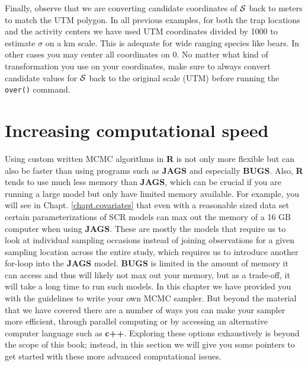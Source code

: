 Finally, observe that we are converting candidate coordinates of ${\cal S}$
back to meters to match the UTM polygon. In all previous examples,
for both the trap locations and the activity centers we have used UTM
coordinates divided by 1000 to estimate $\sigma$ on a km scale. This is
adequate for wide ranging species like bears. In other cases you
may center all coordinates on 0. No matter what kind of transformation you
use on your coordinates, make sure to always convert candidate values for
${\cal S}$ back to the original scale (UTM) before running the
\verb#over()# command.

\section{Increasing computational speed}
Using custom written MCMC algorithms in {\bf R} is not only more flexible but can also be faster than using programs such as {\bf JAGS} and especially {\bf BUGS}. Also, {\bf R} tends to use much less memory than {\bf JAGS}, which can be crucial if you are running a large model but only have limited memory available. For example, you will see in Chapt. \ref{chapt.covariates} that even with a reasonable sized data set certain parameterizations of SCR models can max out the memory of a 16 GB computer when using {\bf JAGS}. These are mostly the models that require us to look at individual sampling occasions instead of joining observations for a given sampling location across the entire study, which requires us to introduce another for-loop into the {\bf JAGS} model. {\bf BUGS} is limited in the amount of memory it can access and thus will likely not max out your memory, but as a trade-off, it will take a long time to run such models. In this chapter we have provided you with the guidelines to write your own MCMC sampler. But beyond the material that we have covered there are a number of ways you can make your sampler more efficient, through parallel computing or by accessing an alternative computer language such as {\bf c++}. Exploring these options exhaustively is beyond the scope of this book; instead, in this section we will give you some pointers to get started with these more advanced computational issues.

